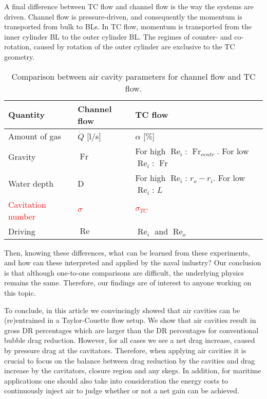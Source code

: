 \documentclass[aps,onecolumn,10pt, floatfix, superscriptaddress,longbibliography, pra]{revtex4-1}
\newcommand{\red}[1]{\textcolor{red}{#1}}
\newcommand{\Fr}{\operatorname{Fr}}
\renewcommand{\Re}{\operatorname{Re}}
\begin{document}
 A final difference between TC flow and channel flow is the way the systems are driven. Channel flow is pressure-driven, and consequently the momentum is transported from bulk to BLs. In TC flow, momentum is transported from the inner cylinder BL to the outer cylinder BL. The regimes of counter- and  co-rotation, caused by rotation of the outer cylinder are exclusive to the TC geometry.

\begin{table}[htp]
\begin{center}
\begin{tabular}{lll}
Quantity & Channel flow & TC flow \\
\hline
Amount of gas& $\dot{Q}$ [l/s] & $\alpha$ [\%] \\
Gravity & $\Fr$ &   For high $\Re_i$: $\Fr_{centr}$.  For low $\Re_i$: $\Fr$ \\
Water depth & D & For high $\Re_i$:  $r_o-r_i$. For low $\Re_i$: $L$ \\
\red{Cavitation number} & \red{$\sigma$} & \red{$\sigma_{TC}$}  \\
Driving & $\Re$ & $\Re_i$ and $\Re_o$  \\
\end{tabular}
\end{center}
\caption{Comparison between air cavity parameters for channel flow and TC flow.}
\label{tab:1}
\end{table}

Then, knowing these differences, what can be learned from these experiments, and how can these interpreted and applied by the naval industry? Our conclusion is that although one-to-one comparisons are difficult, the underlying physics remains the same. Therefore, our findings are of interest to anyone working on this topic.

To conclude, in this article we convincingly showed that air cavities can be (re)entrained in a Taylor-Couette flow setup. We show that air cavities result in gross DR percentages which are larger than the DR percentages for conventional bubble drag reduction. However, for all cases we see a net drag increase, caused by pressure drag at the cavitators. Therefore, when applying air cavities it is crucial to focus on the balance between drag reduction by the cavities and drag increase by the cavitators, closure region and any skegs. In addition, for maritime applications one should also take into consideration the energy costs to continuously inject air to judge whether or not a net gain can be achieved. 
\end{document}
